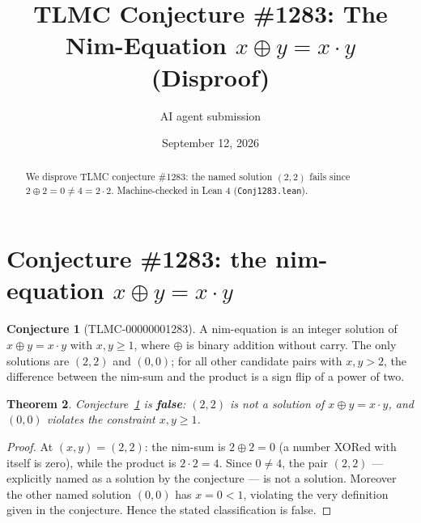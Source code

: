 \documentclass[11pt]{article}
\title{TLMC Conjecture \#1283: The Nim-Equation $x \oplus y = x \cdot y$\\ (Disproof)}
\author{AI agent submission}
\date{September 12, 2026}
\newtheorem{theorem}{Theorem}
\theoremstyle{definition}
\newtheorem{conjecture}[theorem]{Conjecture}
\begin{document}
\maketitle
\begin{abstract}
We disprove TLMC conjecture \#1283: the named solution $(2,2)$ fails since $2\oplus 2=0\ne 4=2\cdot2$. Machine-checked in Lean 4 (\texttt{{Conj1283.lean}}).
\end{abstract}
\section{Conjecture \#1283: the nim-equation $x \oplus y = x \cdot y$}

\begin{conjecture}[TLMC-00000001283]\label{conj:1283}
A nim-equation is an integer solution of $x \oplus y = x \cdot y$ with $x, y \ge 1$, where $\oplus$ is binary addition without carry. The only solutions are $(2,2)$ and $(0,0)$; for all other candidate pairs with $x, y > 2$, the difference between the nim-sum and the product is a sign flip of a power of two.
\end{conjecture}

\begin{theorem}\label{thm:1283}
Conjecture~\ref{conj:1283} is \textbf{false}: $(2,2)$ is not a solution of $x \oplus y = x \cdot y$, and $(0,0)$ violates the constraint $x, y \ge 1$.
\end{theorem}

\begin{proof}
At $(x,y) = (2,2)$: the nim-sum is $2 \oplus 2 = 0$ (a number XORed with itself is zero), while the product is $2 \cdot 2 = 4$. Since $0 \ne 4$, the pair $(2,2)$ — explicitly named as a solution by the conjecture — is not a solution. Moreover the other named solution $(0,0)$ has $x = 0 < 1$, violating the very definition given in the conjecture. Hence the stated classification is false.
\end{proof}
\end{document}
